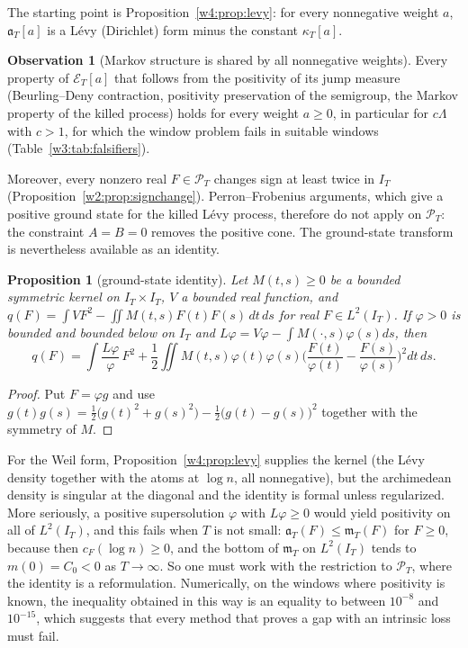 \documentclass[11pt]{amsart}
\newtheorem{proposition}[theorem]{Proposition}
\theoremstyle{definition}
\newtheorem{observation}[theorem]{Observation}
\theoremstyle{remark}
\numberwithin{equation}{section}
\newcommand{\IT}{I_T}                                  %
\newcommand{\cF}{c_F}                                  %
\newcommand{\PT}{\mathcal{P}_T}                        %
\newcommand{\mT}{\mathfrak{m}_T}                       %
\newcommand{\aT}{\mathfrak{a}_T}                       %
\begin{document}
The starting point is Proposition~\ref{w4:prop:levy}: for every nonnegative weight $a$, $\aT[a]$ is a L\'evy (Dirichlet)
form minus the constant $\kappa_T[a]$.

\begin{observation}[Markov structure is shared by all nonnegative weights]\label{w4:obs:markov}
Every property of $\mathcal E_T[a]$ that follows from the positivity of its jump measure (Beurling--Deny contraction, positivity
preservation of the semigroup, the Markov property of the killed process) holds for every weight $a\ge0$, in particular for $c\Lambda$
with $c>1$, for which the window problem fails in suitable windows (Table~\ref{w3:tab:falsifiers}).
\end{observation}

Moreover, every nonzero real $F\in\PT$ changes sign at least twice in $\IT$ (Proposition~\ref{w2:prop:signchange}).
Perron--Frobenius arguments, which give a positive ground state for the killed L\'evy process, therefore do not apply
on $\PT$: the constraint $A=B=0$ removes the positive cone. The ground-state transform is nevertheless available as an
identity.

\begin{proposition}[ground-state identity]\label{w4:prop:groundstate}
Let $M(t,s)\ge0$ be a bounded symmetric kernel on $\IT\times\IT$, $V$ a bounded real function, and $q(F)=\int VF^2-\iint M(t,s)F(t)F(s)\,dt\,ds$
for real $F\in L^2(\IT)$. If $\varphi>0$ is bounded and bounded below on $\IT$ and $L\varphi=V\varphi-\int M(\cdot,s)\varphi(s)ds$, then
\[
q(F)=\int\frac{L\varphi}{\varphi}\,F^2+\frac12\iint M(t,s)\varphi(t)\varphi(s)\Big(\frac{F(t)}{\varphi(t)}-\frac{F(s)}{\varphi(s)}\Big)^2dt\,ds .
\]
\end{proposition}

\begin{proof}
Put $F=\varphi g$ and use $g(t)g(s)=\frac12\big(g(t)^2+g(s)^2\big)-\frac12\big(g(t)-g(s)\big)^2$ together with the symmetry of $M$.
\end{proof}

For the Weil form, Proposition~\ref{w4:prop:levy} supplies the kernel (the L\'evy density together with the atoms at
$\log n$, all nonnegative), but the archimedean density is singular at the diagonal and the identity is formal unless
regularized. More seriously, a positive supersolution $\varphi$ with $L\varphi\ge0$ would yield positivity on all of
$L^2(\IT)$, and this fails when $T$ is not small: $\aT(F)\le\mT(F)$ for $F\ge0$, because then $\cF(\log n)\ge0$, and the bottom of
$\mT$ on $L^2(\IT)$ tends to $m(0)=C_0<0$ as $T\to\infty$. So one must work with the restriction to $\PT$, where the
identity is a reformulation. Numerically, on the windows where positivity is known, the inequality obtained in this way
is an equality to between $10^{-8}$ and $10^{-15}$, which suggests that every method that proves a gap with an intrinsic
loss must fail.
\end{document}
